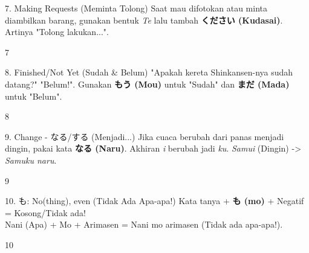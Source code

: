 \begin{lessonbox}{7. Making Requests (Meminta Tolong)}
    Saat mau difotokan atau minta diambilkan barang, gunakan bentuk \textit{Te} lalu tambah \textbf{ください (Kudasai)}. Artinya "Tolong lakukan...".
\end{lessonbox}
\begin{convobox}{7}
    \noindent
      

    \vspace{1.5em}
\end{convobox}

\begin{lessonbox}{8. Finished/Not Yet (Sudah \& Belum)}
    "Apakah kereta Shinkansen-nya sudah datang?" "Belum!". Gunakan \textbf{もう (Mou)} untuk "Sudah" dan \textbf{まだ (Mada)} untuk "Belum".
\end{lessonbox}
\begin{convobox}{8}
    \noindent
      
     

    \vspace{1.5em}
\end{convobox}

\begin{lessonbox}{9. Change - なる/する (Menjadi...)}
    Jika cuaca berubah dari panas menjadi dingin, pakai kata \textbf{なる (Naru)}. Akhiran \textit{i} berubah jadi \textit{ku}. \textit{Samui} (Dingin) -> \textit{Samuku naru}.
\end{lessonbox}
\begin{convobox}{9}
    \noindent

    \vspace{1.5em}
\end{convobox}

\begin{lessonbox}{10. も: No(thing), even (Tidak Ada Apa-apa!)}
    Kata tanya + \textbf{も (mo)} + Negatif = Kosong/Tidak ada! \\
    Nani (Apa) + Mo + Arimasen = Nani mo arimasen (Tidak ada apa-apa!).
\end{lessonbox}
\begin{convobox}{10}
    \noindent
      

    \vspace{1.5em}
\end{convobox}

